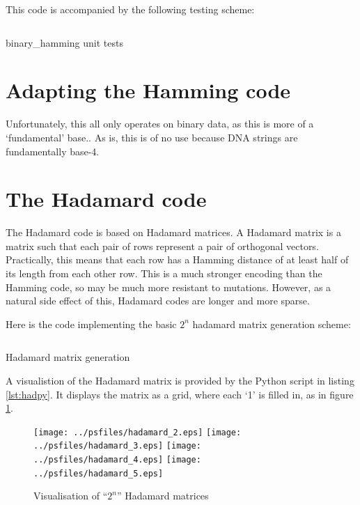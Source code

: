 \documentclass[11pt]{article}
\newenvironment{longlisting}
{\addvspace{\baselineskip}\captionsetup{type=listing}}
{\addvspace{\baselineskip}}
\begin{document}
    This code is accompanied by the following testing scheme:

\begin{longlisting}
\inputminted{python}{../src/test_binary_hamming.py}
\caption{binary\_hamming unit tests}
\end{longlisting}

    \section{Adapting the Hamming code}

    Unfortunately, this all only operates on binary data, as this is more of a
    `fundamental' base.. As is, this is of no use because DNA strings are
    fundamentally base-4.

    \section{The Hadamard code}


    The Hadamard code is based on Hadamard matrices. A Hadamard matrix is a
    matrix such that each pair of rows represent a pair of orthogonal vectors.
    Practically, this means that each row has a Hamming distance of at least
    half of its length from each other row. This is a much stronger encoding
    than the Hamming code, so may be much more resistant to mutations. However,
    as a natural side effect of this, Hadamard codes are longer and more sparse.

    Here is the code implementing the basic $2^n$ hadamard matrix generation
    scheme:

\begin{longlisting}
\inputminted{python}{../src/hadamard_matrix.py}
\caption{Hadamard matrix generation}
\end{longlisting}



    A visualistion of the Hadamard matrix is provided by the Python script in
    listing \ref{lst:hadpy}. It displays the matrix as a grid, where each `1' is
    filled in, as in figure \ref{fig:hadvis}.

\begin{figure}[H]
\begin{center}
\texttt{[image: ../psfiles/hadamard\_2.eps]}%
\hfill%
\texttt{[image: ../psfiles/hadamard\_3.eps]}%
\hfill%
\texttt{[image: ../psfiles/hadamard\_4.eps]}%
\hfill%
\texttt{[image: ../psfiles/hadamard\_5.eps]}%
\end{center}
\caption{Visualisation of ``$2^n$'' Hadamard matrices}\label{fig:hadvis}
\end{figure}
\end{document}
